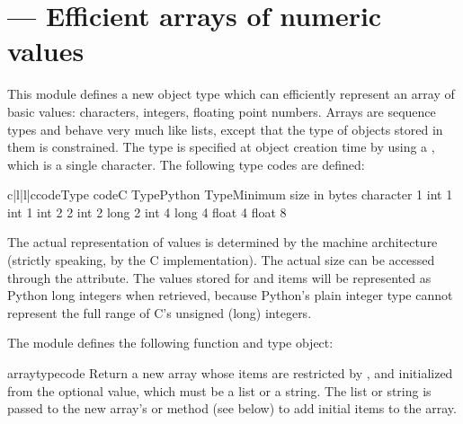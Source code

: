 \section{ ---
         Efficient arrays of numeric values}



This module defines a new object type which can efficiently represent
an array of basic values: characters, integers, floating point
numbers.  Arrays are sequence types and behave very much
like lists, except that the type of objects stored in them is
constrained.  The type is specified at object creation time by using a
, which is a single character.  The following type
codes are defined:

\begin{tableiv}{c|l|l|c}{code}{Type code}{C Type}{Python Type}{Minimum size in bytes}
            {character}        {1}
     {int}              {1}
   {int}              {1}
    {int}              {2}
                {2}
      {int}              {2}
    {long}             {2}
     {int}              {4}
   {long}             {4}
           {float}            {4}
          {float}            {8}
\end{tableiv}

The actual representation of values is determined by the machine
architecture (strictly speaking, by the C implementation).  The actual
size can be accessed through the  attribute.  The values
stored  for  and  items will be represented as
Python long integers when retrieved, because Python's plain integer
type cannot represent the full range of C's unsigned (long) integers.


The module defines the following function and type object:

\begin{funcdesc}{array}{typecode}
Return a new array whose items are restricted by , and
initialized from the optional  value, which must be a
list or a string.  The list or string is passed to the new array's
 or  method (see below) to add
initial items to the array.
\end{funcdesc}

